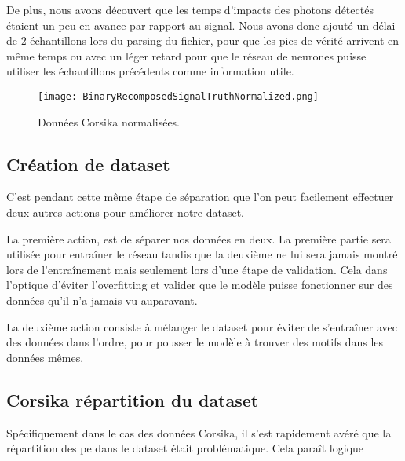 De plus, nous avons découvert que les temps d'impacts des photons détectés étaient un peu en avance par rapport
au signal. Nous avons donc ajouté un délai de 2 échantillons lors du parsing du fichier, pour que les pics de vérité arrivent en 
même temps ou avec un léger retard pour que le réseau de neurones puisse utiliser les échantillons précédents comme information utile.

\newpage
\begin{figure}[tbph!]
	\centering
	\texttt{[image: BinaryRecomposedSignalTruthNormalized.png]}
	\caption[Données Corsika normalisées]{Données Corsika normalisées.}
\end{figure}












\subsection{Création de dataset}
C'est pendant cette même étape de séparation que l'on peut facilement effectuer deux autres actions pour améliorer notre dataset.

La première action, est de séparer nos données en deux. La première partie sera utilisée pour entraîner le réseau tandis que la deuxième ne
lui sera jamais montré lors de l'entraînement mais seulement lors d'une étape de validation. Cela dans l'optique d'éviter l'overfitting
et valider que le modèle puisse fonctionner sur des données qu'il n'a jamais vu auparavant.

La deuxième action consiste à mélanger le dataset pour éviter de s'entraîner avec des données dans l'ordre, pour pousser 
le modèle à trouver des motifs dans les données mêmes.

\subsection{Corsika répartition du dataset}
Spécifiquement dans le cas des données Corsika, il s'est rapidement avéré que la répartition des \gls{pe} dans le dataset était problématique.
Cela paraît logique
